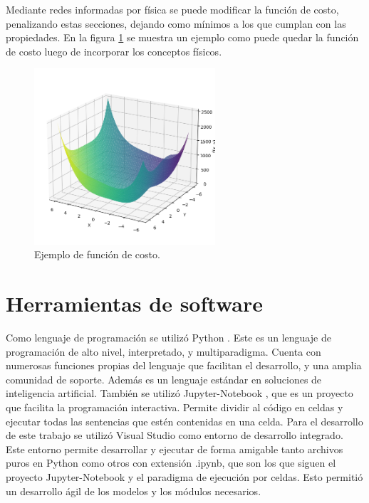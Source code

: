 Mediante redes informadas por física se puede modificar la función de costo, penalizando estas secciones, dejando como mínimos a los que cumplan con las propiedades. En la figura \ref{fig:modified-loss} se muestra un ejemplo como puede quedar la función de costo luego de incorporar los conceptos físicos.

\begin{figure}[htbp]
	\centering
	\includegraphics[width=0.6\textwidth]{./Figures/costo-modificada.png}
	\caption{Ejemplo de función de costo.}
	\label{fig:modified-loss}
\end{figure}

\section{Herramientas de software}
Como lenguaje de programación se utilizó Python \citep{python}. Este es un lenguaje de programación de alto nivel, interpretado, y multiparadigma. Cuenta con numerosas funciones propias del lenguaje que facilitan el desarrollo, y una amplia comunidad de soporte. Además es un lenguaje estándar en soluciones de inteligencia artificial.
También se utilizó Jupyter-Notebook \citep{jupyter}, que es un proyecto que facilita la programación interactiva. Permite dividir al código en celdas y ejecutar todas las sentencias que estén contenidas en una celda. 
Para el desarrollo de este trabajo se utilizó Visual Studio como entorno de desarrollo integrado. Este entorno permite desarrollar y ejecutar de forma amigable tanto archivos puros en Python como otros con extensión .ipynb, que son los que siguen el proyecto Jupyter-Notebook y el paradigma de ejecución por celdas. Esto permitió un desarrollo ágil de los modelos y los módulos necesarios.

